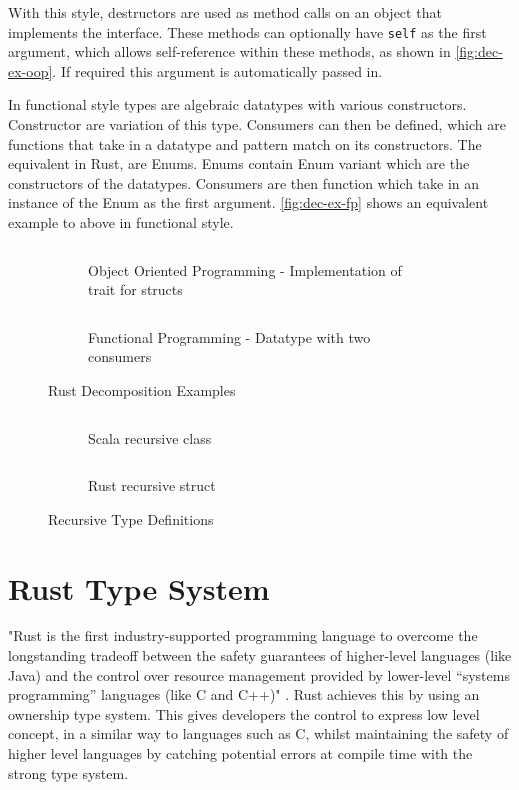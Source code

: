 \documentclass[ oneside,%
                    author={James Elgar},
                    degree={MEng},
                     title={Bidirectional transformer between functional and \\ object-oriented programming in Rust},
                  subtitle={}]{dissertation}
\newcommand{\codefile}[2]{\inputminted[xleftmargin=20pt,linenos, breaklines]{#1}{#2}}
\newcommand{\rustfile}[1]{\codefile{rust}{../src/#1.rs}}
\newcommand{\rustexample}[1]{\rustfile{examples/#1}}
\begin{document}
With this style, destructors are used as method calls on an object that implements the interface. These methods can optionally have \verb|self| as the first argument, which allows self-reference within these methods, as shown in \autoref{fig:dec-ex-oop}. If required this argument is automatically passed in.

In functional style types are algebraic datatypes with various constructors. Constructor are variation of this type. Consumers can then be defined, which are functions that take in a datatype and pattern match on its constructors. The equivalent in Rust, are Enums. Enums contain Enum variant which are the constructors of the datatypes. Consumers are then function which take in an instance of the Enum as the first argument.  \autoref{fig:dec-ex-fp} shows an equivalent example to above in functional style.

\begin{figure}
\centering
\begin{subfigure}{.5\textwidth}
    \rustexample{shape/oop}
    \caption{Object Oriented Programming - Implementation of trait for structs}
    \label{fig:dec-ex-oop}
\end{subfigure}%
\begin{subfigure}{.5\textwidth}
    \rustexample{shape/fp}
    \caption{Functional Programming - Datatype with two consumers}
    \label{fig:dec-ex-fp}
\end{subfigure}
\caption{Rust Decomposition Examples}
\label{fig:dec-ex}
\end{figure}

\begin{figure}
\centering
\begin{subfigure}{.5\textwidth}
    \codefile{scala}{../scala/examples/src/main/scala/RecursiveType.scala}
    \caption{Scala recursive class}
    \label{fig:dec-ex-oop}
\end{subfigure}%
\begin{subfigure}{.5\textwidth}
    \rustexample{list/oop}
    \caption{Rust recursive struct}
    \label{fig:dec-ex-fp}
\end{subfigure}
\caption{Recursive Type Definitions}
\label{fig:dec-ex}
\end{figure}



\section{Rust Type System}
"Rust is the first industry-supported programming language to overcome the longstanding tradeoff between the safety guarantees of higher-level languages (like Java) and the control over resource management provided by lower-level “systems programming” languages (like C and C++)" \cite{rustsafesystems}. Rust achieves this by using an ownership type system. This gives developers the control to express low level concept, in a similar way to languages such as C, whilst maintaining the safety of higher level languages by catching potential errors at compile time with the strong type system. 
\end{document}
